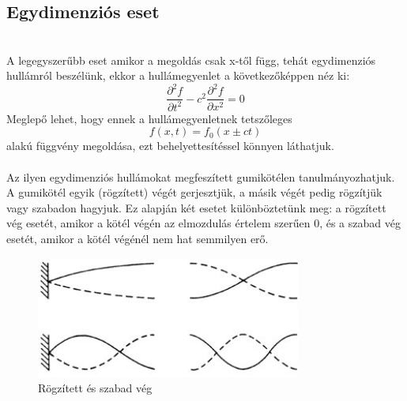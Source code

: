 \documentclass[a4paper]{article}
\begin{document}
\subsection*{Egydimenziós eset}
\\
A legegyszerűbb eset amikor a megoldás csak x-től függ, tehát egydimenziós hullámról beszélünk, ekkor a hullámegyenlet a következőképpen néz ki:
\begin{equation}
\frac{\partial^2 f}{\partial t^2}-c^2\frac{\partial^2 f}{\partial x^{2}}=0
\end{equation}
Meglepő lehet, hogy ennek a hullámegyenletnek tetszőleges
\begin{equation}
f(x,t)=f_0(x \pm ct)
\end{equation}
alakú függvény megoldása, ezt behelyettesítéssel könnyen láthatjuk.
\\
\\
Az ilyen egydimenziós hullámokat megfeszített gumikötélen tanulmányozhatjuk.
\\
A gumikötél egyik (rögzített) végét gerjesztjük, a másik végét pedig rögzítjük vagy szabadon hagyjuk. Ez alapján két esetet különböztetünk meg: a rögzített vég esetét, amikor a kötél végén az elmozdulás értelem szerűen $0$, és a szabad vég esetét, amikor a kötél végénél nem hat semmilyen erő.
\begin{figure}[!h]
	\includegraphics[height=4cm]{./allohullam.jpg}
	\centering
	\caption{Rögzített és szabad vég}
	\label{fig:abra}
	\end{figure}
\\
\end{document}
